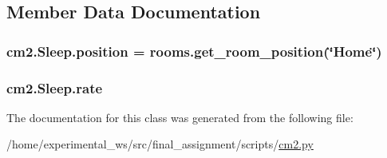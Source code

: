 \subsection{Member Data Documentation}
\subsubsection[{\texorpdfstring{position}{position}}]{\setlength{\rightskip}{0pt plus 5cm}cm2.\+Sleep.\+position = rooms.\+get\+\_\+room\+\_\+position(\char`\"{}Home\char`\"{})\hspace{0.3cm}{\ttfamily [static]}}\hypertarget{classcm2_1_1Sleep_a886baa0aea7f50e59cc84418cefaf85b}{}\label{classcm2_1_1Sleep_a886baa0aea7f50e59cc84418cefaf85b}
\subsubsection[{\texorpdfstring{rate}{rate}}]{\setlength{\rightskip}{0pt plus 5cm}cm2.\+Sleep.\+rate}\hypertarget{classcm2_1_1Sleep_a666ea7e9b7ab31265b77a6ce88bbdc06}{}\label{classcm2_1_1Sleep_a666ea7e9b7ab31265b77a6ce88bbdc06}


The documentation for this class was generated from the following file\+:\begin{DoxyCompactItemize}
\item 
/home/experimental\+\_\+ws/src/final\+\_\+assignment/scripts/\hyperlink{cm2_8py}{cm2.\+py}\end{DoxyCompactItemize}
